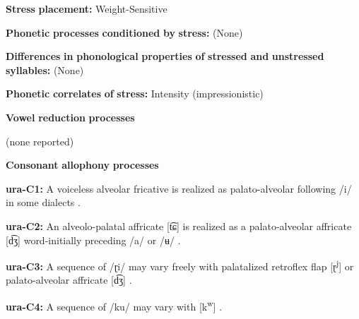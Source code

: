 \begin{styleBody}
\textbf{Stress} \textbf{placement:} Weight-Sensitive
\end{styleBody}

\begin{styleBody}
\textbf{Phonetic} \textbf{processes} \textbf{conditioned} \textbf{by} \textbf{stress:} (None)
\end{styleBody}

\begin{styleBody}
\textbf{Differences} \textbf{in} \textbf{phonological} \textbf{properties} \textbf{of} \textbf{stressed} \textbf{and} \textbf{unstressed} \textbf{syllables:} (None)
\end{styleBody}

\begin{styleBody}
\textbf{Phonetic} \textbf{correlates} \textbf{of} \textbf{stress:} Intensity (impressionistic)
\end{styleBody}

\begin{styleBody}
\textbf{Vowel} \textbf{reduction} \textbf{processes}
\end{styleBody}

\begin{styleBody}
(none reported)
\end{styleBody}

\begin{styleBody}
\textbf{Consonant} \textbf{allophony} \textbf{processes}
\end{styleBody}

\begin{styleBody}
\textbf{ura-C1:} A voiceless alveolar fricative is realized as palato-alveolar following /i/ in some dialects \citep[38]{Olawsky2006}.
\end{styleBody}

\begin{styleBody}
\textbf{ura-C2:} An alveolo-palatal affricate [t͡ɕ] is realized as a palato-alveolar affricate [d͡ʒ] word-initially preceding /a/ or /ʉ/ \citep[39]{Olawsky2006}.
\end{styleBody}

\begin{styleBody}
\textbf{ura-C3:} A sequence of /ɽi/ may vary freely with palatalized retroflex flap [ɽ\textsuperscript{j}] or palato-alveolar affricate [d͡ʒ] \citep[71]{Olawsky2006}.
\end{styleBody}

\begin{styleBody}
\textbf{ura-C4:} A sequence of /ku/ may vary with [k\textsuperscript{w}] \citep[37]{Olawsky2006}.
\end{styleBody}

